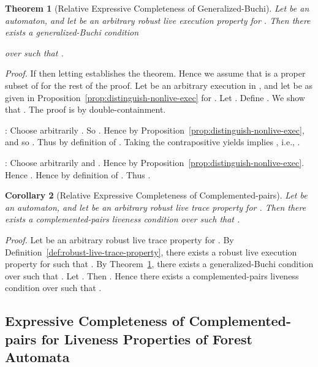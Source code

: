 \documentclass[11pt]{article}
\newcommand{\bco}{\begin{corollary}}
\newcommand{\eco}{\end{corollary}}
\newcommand{\bt}{\begin{theorem}}
\newcommand{\et}{\end{theorem}}
\newcommand{\bpr}{\begin{proof}}
\newcommand{\epr}{\end{proof}}
\newtheorem{theorem}{Theorem}
\newtheorem{corollary}[theorem]{Corollary}
\newenvironment{proof}{\vspace{-1.0ex}\textit{Proof.} }
                      {\hfill{}}
\begin{document}


\bt[Relative Expressive Completeness of Generalized-Buchi]
\label{thm:execs-relative-completeness}
Let  be an automaton, and let  be an arbitrary
robust live execution property for . 
Then there exists a generalized-Buchi condition 
 
over  such that                     .
\et
\bpr
If  then letting 
establishes the theorem. Hence we assume that
 is a proper subset of  for the rest of the proof.
Let  be an arbitrary execution in , and let
 be as given in Proposition~\ref{prop:distinguish-nonlive-exec} for .
Let .
Define .
We show that .
The proof is by double-containment.


\noindent
{}:
Choose arbitrarily .
So .
Hence  by 
Proposition~\ref{prop:distinguish-nonlive-exec}, and so 
.
Thus  by definition of .
Taking the contrapositive yields 
 implies , i.e., .

\noindent
{}:
Choose arbitrarily  and .
Hence  by
Proposition~\ref{prop:distinguish-nonlive-exec}. 
Hence .
Hence  by definition of .
Thus .
\epr




\bco[Relative Expressive Completeness of Complemented-pairs]
\label{thm:traces-relative-completeness}
Let  be an automaton, and let  be an arbitrary
robust live trace property for . Then there exists a 
complemented-pairs liveness condition
 over  such that .
\eco
\bpr
Let  be an arbitrary robust live trace property for .
By Definition~\ref{def:robust-live-trace-property}, 
there exists a robust live execution property  for  such that 
.
By Theorem~\ref{thm:execs-relative-completeness}, there exists a 
generalized-Buchi condition  over 
such that 
.
Let . Then 
.
Hence there exists a complemented-pairs liveness condition
 over  such that .
\epr





\subsection{Expressive Completeness of Complemented-pairs for Liveness Properties of 
            Forest Automata}
\label{sec:forest}
\end{document}
